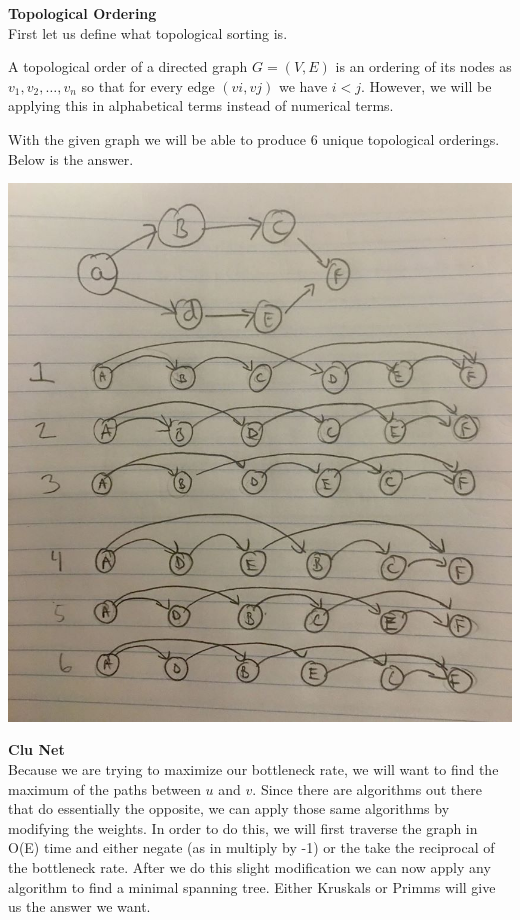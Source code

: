 \documentclass[11pt]{article}
\begin{document}
\newpage
\begin{solution} \textbf{Topological Ordering} \\

	First let us define what topological sorting is.
	
	\hfil
	
	A topological order of a directed graph $G = (V, E)$ is an ordering of its nodes as $v_1, v_2, …, v_n$ so that for every edge $(vi, vj)$ we have $i < j$. However, we will be applying this in alphabetical terms instead of numerical terms.
	
	\hfil
	
	With the given graph we will be able to produce 6 unique topological orderings.
	Below is the answer.
	 
	\begin{center}
		\includegraphics[width=15cm]{topo.jpg}
	\end{center}
	
	
\end{solution}


\begin{solution}\textbf{Clu Net}\\
	
	Because we are trying to maximize our bottleneck rate, we will want to find the maximum of the paths between $u$ and $v$. Since there are algorithms out there that do essentially the opposite, we can apply those same algorithms by modifying the weights. In order to do this, we will first traverse the graph in O(E) time and either negate (as in multiply by -1)  or the take the reciprocal of the bottleneck rate. After we do this slight modification we can now apply any algorithm to find a minimal spanning tree. Either Kruskals or Primms will give us the answer we want. 
	
	
\end{solution}
\end{document}
